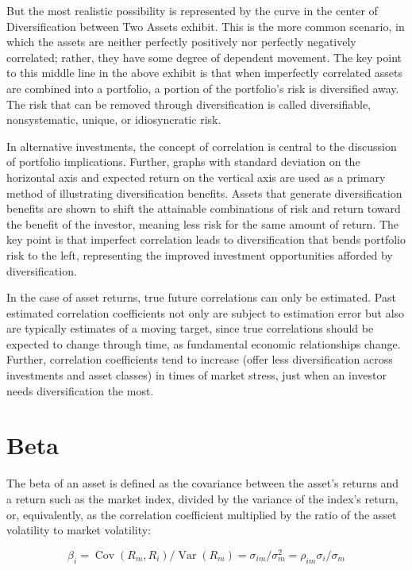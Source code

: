 \documentclass[11pt]{article}
\begin{document}
But the most realistic possibility is represented by the curve in the center of Diversification between Two Assets exhibit. This is the more common scenario, in which the assets are neither perfectly positively nor perfectly negatively correlated; rather, they have some degree of dependent movement. The key point to this middle line in the above exhibit is that when imperfectly correlated assets are combined into a portfolio, a portion of the portfolio's risk is diversified away. The risk that can be removed through diversification is called diversifiable, nonsystematic, unique, or idiosyncratic risk.

In alternative investments, the concept of correlation is central to the discussion of portfolio implications. Further, graphs with standard deviation on the horizontal axis and expected return on the vertical axis are used as a primary method of illustrating diversification benefits. Assets that generate diversification benefits are shown to shift the attainable combinations of risk and return toward the benefit of the investor, meaning less risk for the same amount of return. The key point is that imperfect correlation leads to diversification that bends portfolio risk to the left, representing the improved investment opportunities afforded by diversification.

In the case of asset returns, true future correlations can only be estimated. Past estimated correlation coefficients not only are subject to estimation error but also are typically estimates of a moving target, since true correlations should be expected to change through time, as fundamental economic relationships change. Further, correlation coefficients tend to increase (offer less diversification across investments and asset classes) in times of market stress, just when an investor needs diversification the most.

\section*{Beta}
The beta of an asset is defined as the covariance between the asset's returns and a return such as the market index, divided by the variance of the index's return, or, equivalently, as the correlation coefficient multiplied by the ratio of the asset volatility to market volatility:


\begin{equation*}
\beta_{i}=\operatorname{Cov}\left(R_{m}, R_{i}\right) / \operatorname{Var}\left(R_{m}\right)=\sigma_{i m} / \sigma_{m}^{2}=\rho_{i m} \sigma_{i} / \sigma_{m} \tag{5}
\end{equation*}
\end{document}
